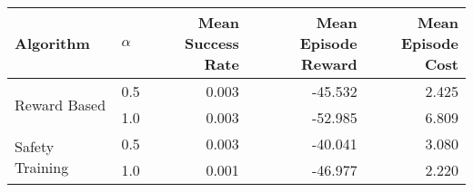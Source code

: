 \begin{tabular}{llrrr}
\toprule
Algorithm & $\alpha$   & \makecell{Mean\\Success Rate} & \makecell{Mean\\Episode Reward} & \makecell{Mean\\Episode Cost} \\
\midrule
\multirow{2}{*}{Reward Based} & 0.5 &             0.003 &     -45.532 &     2.425 \\
                & 1.0 &             0.003 &     -52.985 &     6.809 \\
\cline{1-5}
\multirow{2}{*}{Safety Training} & 0.5 &             0.003 &     -40.041 &     3.080 \\
                & 1.0 &             0.001 &     -46.977 &     2.220 \\
\bottomrule
\end{tabular}
